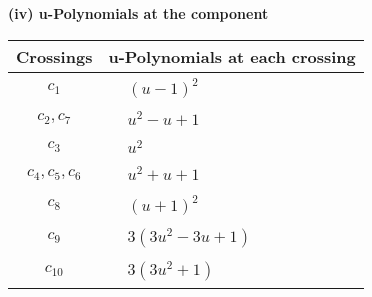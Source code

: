 \documentclass[1p]{elsarticle_modified}
\theoremstyle{definition}
\begin{document}
\newpage\renewcommand{\arraystretch}{1}
\flushleft \textbf{(iv) u-Polynomials at the component}\newline \\
\begin{tabular}{m{50pt}|m{274pt}}
Crossings & \hspace{64pt}u-Polynomials at each crossing \\
\hline $$\begin{aligned}c_{1}\end{aligned}$$&$\begin{aligned}
&(u-1)^2
\end{aligned}$\\
\hline $$\begin{aligned}c_{2},c_{7}\end{aligned}$$&$\begin{aligned}
&u^2- u+1
\end{aligned}$\\
\hline $$\begin{aligned}c_{3}\end{aligned}$$&$\begin{aligned}
&u^2
\end{aligned}$\\
\hline $$\begin{aligned}c_{4},c_{5},c_{6}\end{aligned}$$&$\begin{aligned}
&u^2+u+1
\end{aligned}$\\
\hline $$\begin{aligned}c_{8}\end{aligned}$$&$\begin{aligned}
&(u+1)^2
\end{aligned}$\\
\hline $$\begin{aligned}c_{9}\end{aligned}$$&$\begin{aligned}
&3(3 u^2-3 u+1)
\end{aligned}$\\
\hline $$\begin{aligned}c_{10}\end{aligned}$$&$\begin{aligned}
&3(3 u^2+1)
\end{aligned}$\\
\hline
\end{tabular}\\~\\
\newpage\renewcommand{\arraystretch}{1}
\end{document}
